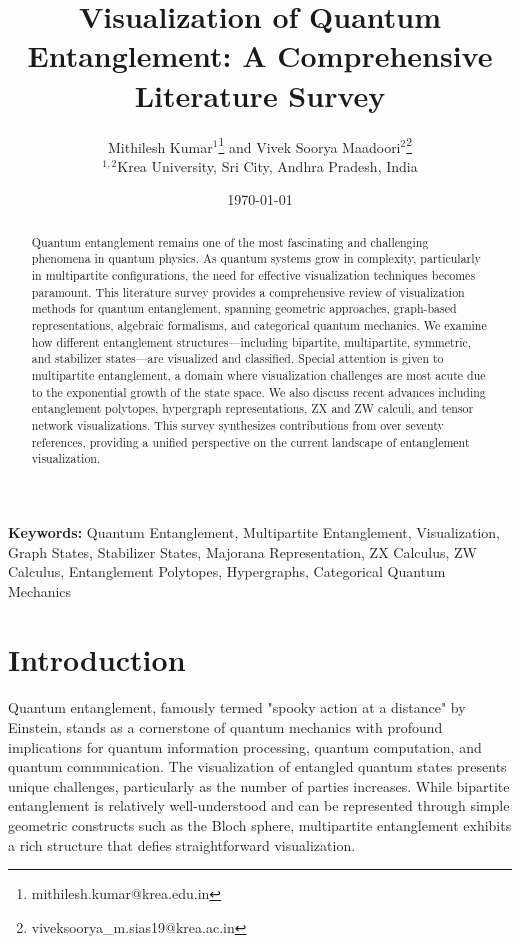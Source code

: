 \documentclass[12pt,a4paper]{article}
\title{Visualization of Quantum Entanglement: A Comprehensive Literature Survey}
\author{Mithilesh Kumar$^{1}$\thanks{mithilesh.kumar@krea.edu.in} and Vivek Soorya Maadoori$^{2}$\thanks{viveksoorya\_m.sias19@krea.ac.in}\\
$^{1,2}$Krea University, Sri City, Andhra Pradesh, India}
\date{\today}
\begin{document}
\maketitle

\begin{abstract}
	Quantum entanglement remains one of the most fascinating and challenging phenomena in quantum physics. As quantum systems grow in complexity, particularly in multipartite configurations, the need for effective visualization techniques becomes paramount. This literature survey provides a comprehensive review of visualization methods for quantum entanglement, spanning geometric approaches, graph-based representations, algebraic formalisms, and categorical quantum mechanics. We examine how different entanglement structures---including bipartite, multipartite, symmetric, and stabilizer states---are visualized and classified. Special attention is given to multipartite entanglement, a domain where visualization challenges are most acute due to the exponential growth of the state space. We also discuss recent advances including entanglement polytopes, hypergraph representations, ZX and ZW calculi, and tensor network visualizations. This survey synthesizes contributions from over seventy references, providing a unified perspective on the current landscape of entanglement visualization.
\end{abstract}

\bigskip

\textbf{Keywords:} Quantum Entanglement, Multipartite Entanglement, Visualization, Graph States, Stabilizer States, Majorana Representation, ZX Calculus, ZW Calculus, Entanglement Polytopes, Hypergraphs, Categorical Quantum Mechanics

\newpage

\tableofcontents

\newpage

\section{Introduction}
\label{sec:intro}

Quantum entanglement, famously termed "spooky action at a distance" by Einstein, stands as a cornerstone of quantum mechanics with profound implications for quantum information processing, quantum computation, and quantum communication. The visualization of entangled quantum states presents unique challenges, particularly as the number of parties increases. While bipartite entanglement is relatively well-understood and can be represented through simple geometric constructs such as the Bloch sphere, multipartite entanglement exhibits a rich structure that defies straightforward visualization.
\end{document}
